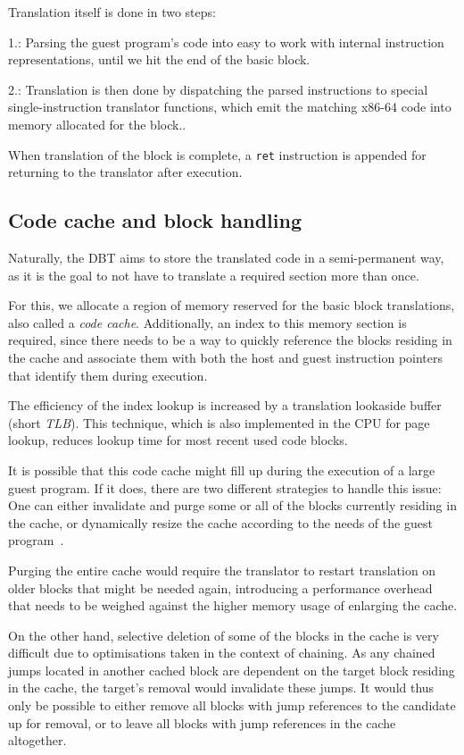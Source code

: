 Translation itself is done in two steps: 

1.: Parsing the guest program's code into easy to work with internal instruction representations, until we hit the end of the basic block.

2.: Translation is then done by dispatching the parsed instructions to special single-instruction translator functions, which emit the matching x86-64 code into memory allocated for the block..

When translation of the block is complete, a \texttt{ret} instruction is appended for returning to the translator after execution.


\subsection{Code cache and block handling}
\label{sec:code-cache}
Naturally, the DBT aims to store the translated code in a semi-permanent way, as it is the goal to not have to translate a required section more than once.

For this, we allocate a region of memory reserved for the basic block translations, also called a \textit{code cache}.
Additionally, an index to this memory section is required, since there needs to be a way to quickly reference the blocks residing in the cache and associate them with both the host and guest instruction pointers that identify them during execution.

The efficiency of the index lookup is increased by a translation lookaside buffer (short \textit{TLB}).
This technique, which is also implemented in the CPU for page lookup, reduces lookup time for most recent used code blocks.

It is possible that this code cache might fill up during the execution of a large guest program.
If it does, there are two different strategies to handle this issue:
One can either invalidate and purge some or all of the blocks currently residing in the cache, or dynamically resize the cache according to the needs of the guest program~\cite[S. 3]{bintrans}.

Purging the entire cache would require the translator to restart translation on older blocks that might be needed again, introducing a performance overhead that needs to be weighed against the higher memory usage of enlarging the cache.

On the other hand, selective deletion of some of the blocks in the cache is very difficult due to optimisations taken in the context of chaining.
As any chained jumps located in another cached block are dependent on the target block residing in the cache, the target's removal would invalidate these jumps.
It would thus only be possible to either remove all blocks with jump references to the candidate up for removal, or to leave all blocks with jump references in the cache altogether.

